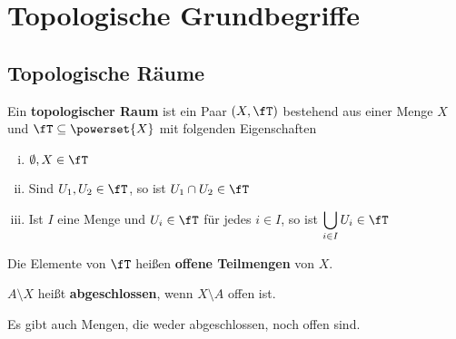 \chapter{Topologische Grundbegriffe}
\section{Topologische Räume}
\begin{definition}   
    Ein \textbf{topologischer Raum} ist ein Paar $(X, \fT)$ bestehend
    aus einer Menge $X$ und $\fT \subseteq \powerset{X}$ mit
    folgenden Eigenschaften
    \begin{enumerate}[(i)]
        \item $\emptyset, X \in \fT$
        \item Sind $U_1, U_2 \in \fT$, so ist $U_1 \cap U_2 \in \fT$
        \item Ist $I$ eine Menge und $U_i \in \fT$ für jedes $i \in I$,
              so ist $\displaystyle \bigcup_{i \in I} U_i \in \fT$
    \end{enumerate}
    Die Elemente von $\fT$ heißen \textbf{offene Teilmengen} von $X$. 

    $A \setminus X$ heißt \textbf{abgeschlossen}, wenn $X \setminus A$ offen ist.

\end{definition}

Es gibt auch Mengen, die weder abgeschlossen, noch offen sind.


